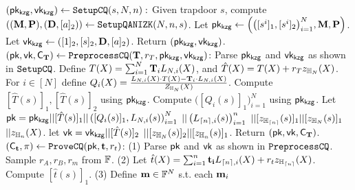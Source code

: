 \def\hp{\hspace*{0.1in}}
\begin{footnotesize}
\begin{algorithm}[bt]
$(\mathsf{pk_{kzg}},\mathsf{vk_{kzg}}) \leftarrow {\texttt{SetupCQ}}(s, N, n):$  \newline
Given trapdoor $s$,
compute $(({{\mathbf {M}}},{{\mathbf {P}}}), ({{\mathbf {D}}}, [a]_2)) \leftarrow
	\texttt{SetupQANIZK}(N, n, s)$. \newline
Let $\mathsf{pk_{kzg}} \leftarrow \left(\big([s^i]_1, [s^i]_2\big)_{i=1}^N, 
{{\mathbf {M}}}, 
{{\mathbf {P}}}   
\right)$. \newline
Let $\mathsf{vk_{kzg}} \leftarrow \left(
[1]_2,
[s]_2,
{{\mathbf {D}}},
[a]_2 \right)$. \newline
Return $(\mathsf{pk_{kzg}},\mathsf{vk_{kzg}})$.\\
$(\mathsf{pk},\mathsf{vk},{\mathsf{C}}_{{{\mathbf {T}}}}) 
		\leftarrow {\texttt{PreprocessCQ}}({{\mathbf {T}}}, r_T, \mathsf{pk_{kzg}},\mathsf{vk_{kzg}})$: \newline
	Parse $\mathsf{pk_{kzg}}$ and $\mathsf{vk_{kzg}}$ as shown in ${\texttt{SetupCQ}}$. \newline
	Define $T(X) = \sum_{i=1}^N {{\mathbf {T}}}_i L_{N,i}(X)$,
	and $\hat{T}(X) = T(X) + r_T z_{\mathbb{H}_{N}}(X)$. \newline
	For $i \in [N]$ define $Q_i(X) = 
	\frac{L_{N,i}(X) \cdot T(X) - {{\mathbf {T}}}_i 
	\cdot L_{N,i}(X)}{Z_{{\mathbb{H}_{N}}}(X)}$. \newline
	Compute $[\hat{T}(s)]_1, [\hat{T}(s)]_2$ using $\mathsf{pk_{kzg}}$. \newline
	Compute $\big([Q_i(s)]_1\big)_{i=1}^N$ using $\mathsf{pk_{kzg}}$. \newline
	Let $\mathsf{pk} = \mathsf{pk_{kzg}} || 
		[\hat{T}(s)]_1 || \left([Q_i(s)]_1,L_{N,i}(s)\right)_{i=1}^N$
			$|| \left(L_{{\lceil{n}\rceil},i}(s)\right)_{i=1}^n$
			$|| [z_{\mathbb{H}_{{\lceil{n}\rceil}}}(s)]_1 || [z_{\mathbb{H}_{N}}(s)]_1$
			$|| z_{\mathbb{H}_{n}}(X)$.  \newline
	let $\mathsf{vk} =  \mathsf{vk_{kzg}} || [\hat{T}(s)]_2$
$|| [z_{{\mathbb{H}_{N}}}(s)]_2 ||  [z_{{\mathbb{H}_{n}}}(s)]_1$. \newline
	Return $(\mathsf{pk}, \mathsf{vk}, {\mathsf{C}}_{{{\mathbf {T}}}})$. \\
$({\mathsf{C}}_{{\mathbf {t}}}, \pi) \leftarrow {\texttt{ProveCQ}}(\mathsf{pk}, {{\mathbf {t}}}, r_t)$: \newline
	(1) Parse $\mathsf{pk}$ and $\mathsf{vk}$ as shown in ${\texttt{PreprocessCQ}}$. 
	Sample $r_A, r_B, r_m$ from $\mathbb{F}$.  \newline
	(2) Let $\hat{t}(X) = \sum_{i=1}^n {{\mathbf {t_i}}} L_{{\lceil{n}\rceil},i}(X) + r_t z_{\mathbb{H}_{{\lceil{n}\rceil}}}(X)$.
	Compute $[\hat{t}(s)]_1$.
	\newline
	(3) Define ${{\mathbf {m}}} \in \mathbb{F}^{N}$ s.t. each ${{\mathbf {m}}}_i$ 

\end{algorithm}
\end{footnotesize}
